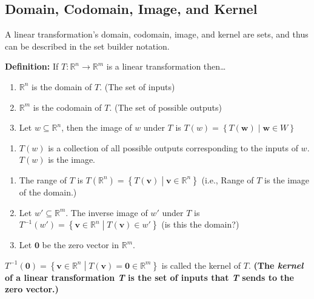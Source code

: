 \documentclass[12pt]{article}
\theoremstyle{plain}
\theoremstyle{remark}
\theoremstyle{definition}
\begin{document}
\subsection{Domain, Codomain, Image, and
Kernel}

A linear transformation's domain, codomain, image, and kernel are sets,
and thus can be described in the set builder notation.

\textbf{Definition:} If \(T:\mathbb{R}^{n} \rightarrow \mathbb{R}^{m}\)
is a linear transformation then\ldots{}

\begin{enumerate}
\def\labelenumi{\arabic{enumi}.}
\item
  \(\mathbb{R}^{n}\) is the domain of \(T\). (The set of inputs)
\item
  \(\mathbb{R}^{m}\) is the codomain of \(T\). (The set of possible
  outputs)
\item
  Let \(w \subseteq \mathbb{R}^{n}\), then the image of \(w\) under
  \(T\) is
  \(T(w) = \left\{ T\left( \mathbf{w} \right) \middle| \mathbf{w} \in W \right\}\)
\end{enumerate}


\begin{enumerate}
\def\labelenumi{\alph{enumi}.}
\item
  \(T(w)\) is a collection of all possible outputs corresponding to the
  inputs of \(w\). \(T(w)\) is the image.
\end{enumerate}

\begin{enumerate}
\def\labelenumi{\arabic{enumi}.}
\setcounter{enumi}{3}
\item
  The range of \(T\) is
  \(T\left( \mathbb{R}^{n} \right) = \left\{ T\left( \mathbf{v} \right) \middle| \mathbf{v} \in \mathbb{R}^{n} \right\}\)
  (i.e., Range of \(T\) is the image of the domain.)
\item
  Let \(w' \subseteq \mathbb{R}^{m}\). The inverse image of \(w'\)
  under \(T\) is
  \(T^{- 1}\left( w' \right) = \left\{ \mathbf{v} \in \mathbb{R}^{n} \middle| T\left( \mathbf{v} \right) \in w' \right\}\)
  (is this the domain?)
\item
  Let \(\mathbf{0}\) be the zero vector in \(\mathbb{R}^{m}\).
\end{enumerate}

\(T^{- 1}\left( \mathbf{0} \right) = \left\{ \mathbf{v} \in \mathbb{R}^{n} \middle| T\left( \mathbf{v} \right) = \mathbf{0} \in \mathbb{R}^{m} \right\}\)
is called the kernel of \(T\). \textbf{(The \emph{kernel} of a linear
transformation \emph{T} is the set of inputs that \emph{T} sends to the
zero vector.)}
\end{document}
